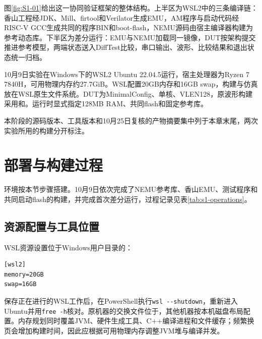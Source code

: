 图\ref{fig:S1-01}给出这一协同验证框架的整体结构。上半区为WSL2中的三条编译链：香山工程经JDK、Mill、firtool和Verilator生成EMU，AM程序与启动代码经RISC-V GCC生成共同的程序BIN和boot-flash，NEMU源码由宿主编译器构建为参考动态库。下半区为差分运行：EMU与NEMU加载同一镜像，DUT按架构提交推进参考模型，两端状态送入DiffTest比较，串口输出、波形、比较结果和退出状态统一归档。


10月9日实验在Windows下的WSL2 Ubuntu 22.04.5运行，宿主处理器为Ryzen 7 7840H，可用物理内存约27.7GiB。WSL配置20GB内存和16GB swap，构建与仿真放在WSL原生文件系统。DUT为MinimalConfig、单核、VLEN128，原波形构建采用和。运行时显式指定128MB RAM、共同flash和固定参考库。

本阶段的源码版本、工具版本和10月25日复核的产物摘要集中列于本章末尾，两次实验所用的构建分开标注。

\section{部署与构建过程}

环境按本节步骤搭建。10月9日依次完成了NEMU参考库、香山EMU、测试程序和共同启动flash的构建，并完成首次差分运行，过程记录见表\ref{tab:s1-operations}。

\subsection{资源配置与工具位置}

WSL资源设置位于Windows用户目录的：
\begin{Verbatim}[breaklines,breakanywhere,breaksymbolleft={},breaksymbolright={},fontsize=\footnotesize,baselinestretch=1]
[wsl2]
memory=20GB
swap=16GB
\end{Verbatim}

保存正在进行的WSL工作后，在PowerShell执行\Verb|wsl --shutdown|，重新进入Ubuntu并用\Verb|free -h|核对。原机器的交换文件位于，其他机器按本机磁盘布局配置。内存规划同时覆盖JVM、硬件生成工具、C++编译进程和文件缓存；频繁换页会增加构建时间，因此应根据可用物理内存调整JVM堆与编译并发。

